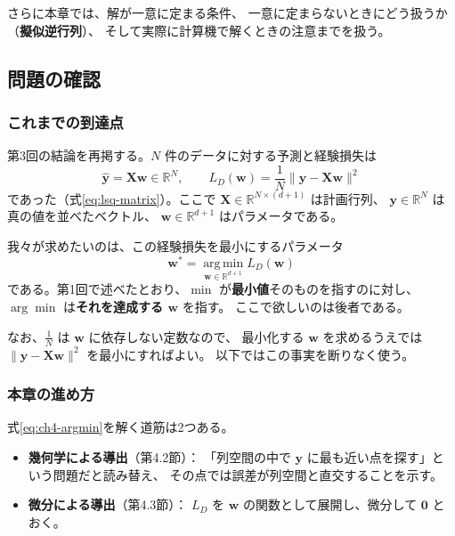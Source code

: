 さらに本章では、解が一意に定まる条件、
一意に定まらないときにどう扱うか（\textbf{擬似逆行列}）、
そして実際に計算機で解くときの注意までを扱う。


\subsection{問題の確認}

\subsubsection{これまでの到達点}

第3回の結論を再掲する。$N$ 件のデータに対する予測と経験損失は
\begin{equation}
  \hat{\bm{y}} = \bm{X}\bm{w} \in \mathbb{R}^N, \qquad
  L_D(\bm{w}) = \frac{1}{N}\|\bm{y} - \bm{X}\bm{w}\|^2
  \label{eq:ch4-setup}
\end{equation}
であった（式\eqref{eq:lsq-matrix}）。ここで
$\bm{X} \in \mathbb{R}^{N \times (d+1)}$ は計画行列、
$\bm{y} \in \mathbb{R}^N$ は真の値を並べたベクトル、
$\bm{w} \in \mathbb{R}^{d+1}$ はパラメータである。

我々が求めたいのは、この経験損失を最小にするパラメータ
\begin{equation}
  \bm{w}^* = \operatorname*{arg\,min}_{\bm{w} \in \mathbb{R}^{d+1}} L_D(\bm{w})
  \label{eq:ch4-argmin}
\end{equation}
である。第1回で述べたとおり、$\min$ が\textbf{最小値}そのものを指すのに対し、
$\arg\min$ は\textbf{それを達成する $\bm{w}$} を指す。
ここで欲しいのは後者である。

なお、$\frac{1}{N}$ は $\bm{w}$ に依存しない定数なので、
最小化する $\bm{w}$ を求めるうえでは
$\|\bm{y} - \bm{X}\bm{w}\|^2$ を最小にすればよい。
以下ではこの事実を断りなく使う。

\subsubsection{本章の進め方}

式\eqref{eq:ch4-argmin}を解く道筋は2つある。

\begin{itemize}
  \item \textbf{幾何学による導出}（第4.2節）：
    「列空間の中で $\bm{y}$ に最も近い点を探す」という問題だと読み替え、
    その点では誤差が列空間と直交することを示す。
  \item \textbf{微分による導出}（第4.3節）：
    $L_D$ を $\bm{w}$ の関数として展開し、微分して $\bm{0}$ とおく。
\end{itemize}

